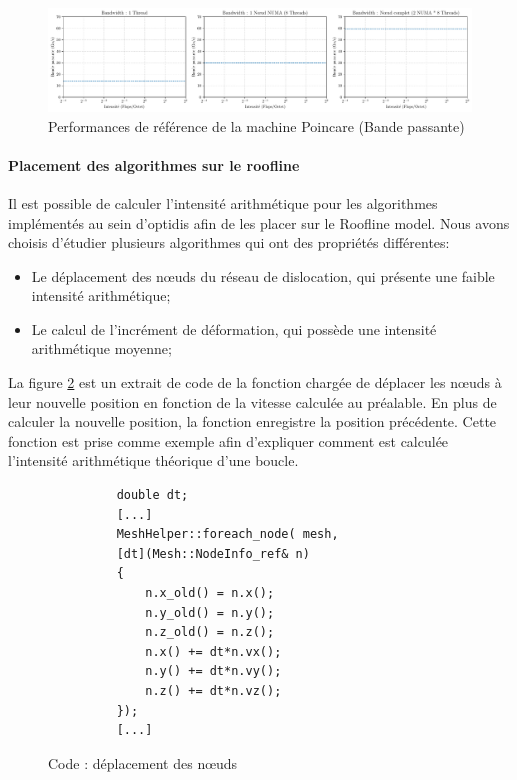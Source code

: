 \begin{figure}
    \centering
    \includegraphics[width=\textwidth]{img/bench_mesh_bande_passante}
    \caption{Performances de référence de la machine Poincare (Bande passante)}
    \label{fig:bench_mesh_bande_passante}
\end{figure}

\paragraph{Placement des algorithmes sur le roofline}

Il est possible de calculer l'intensité arithmétique pour les algorithmes implémentés au sein d'optidis afin de les placer sur le Roofline model. Nous avons choisis d'étudier plusieurs algorithmes qui ont des propriétés différentes:
\begin{itemize}
    \item Le déplacement des nœuds du réseau de dislocation, qui présente une faible intensité arithmétique;
    \item Le calcul de l'incrément de déformation, qui possède une intensité arithmétique moyenne;
\end{itemize}

La figure \ref{fig:movenodes} est un extrait de code de la fonction chargée de déplacer les nœuds à leur nouvelle position en fonction de la vitesse calculée au préalable. En plus de calculer la nouvelle position, la fonction enregistre la position précédente. Cette fonction est prise comme exemple afin d'expliquer comment est calculée l'intensité arithmétique théorique d'une boucle. 

\begin{figure}
    \centering
    \begin{subfigure}[b]{0.47\textwidth}
        \centering
        \begin{verbatim}
    double dt;
    [...]
    MeshHelper::foreach_node( mesh, 
    [dt](Mesh::NodeInfo_ref& n)
    {
        n.x_old() = n.x();
        n.y_old() = n.y();
        n.z_old() = n.z();
        n.x() += dt*n.vx();
        n.y() += dt*n.vy();
        n.z() += dt*n.vz();
    });
    [...]
        \end{verbatim}
    \end{subfigure}
    \caption{Code : déplacement des nœuds}
    \label{fig:movenodes}
\end{figure}

